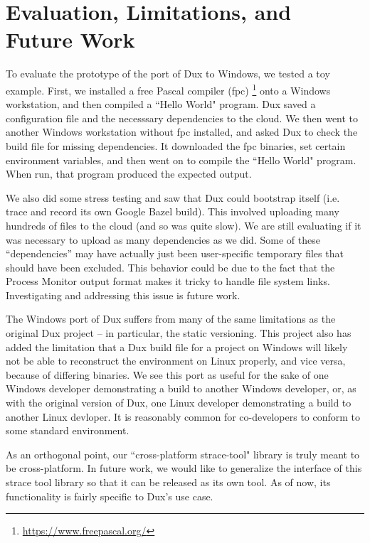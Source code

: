 \documentclass[10pt,conference]{IEEEtran}
\begin{document}
\section{Evaluation, Limitations, and Future Work}

To evaluate the prototype of the port of Dux to Windows, we tested a toy
example. First, we installed a free Pascal compiler (fpc) 
\footnote{\url{https://www.freepascal.org/}} onto a Windows workstation,
and then compiled a ``Hello World" program. Dux saved a configuration 
file and the necesssary dependencies to the cloud. We then went to another Windows
workstation without fpc installed, and asked Dux to check the build file for missing
dependencies. It downloaded the fpc binaries, set certain environment variables,
and then went on to compile the ``Hello World" program. When run, that program
produced the expected output.

We also did some stress testing and saw that Dux could bootstrap itself (i.e. trace
and record its own Google Bazel build). This involved uploading many hundreds
of files to the cloud (and so was quite slow). We are still evaluating if it was
necessary to upload as many dependencies as we did. Some of these 
``dependencies'' may have actually just been user-specific
temporary files that should have been excluded. This behavior could be due
to the fact that the Process Monitor output format makes it tricky to handle file
system links. Investigating and addressing this issue is future work.

The Windows port of Dux suffers from many of the same limitations as the original
Dux project -- in particular, the static versioning. This project also has added
the limitation that a Dux build file for a project on Windows will likely
not be able to reconstruct the environment on Linux properly, and vice versa,
because of differing binaries. We see this port as useful for the sake of one
Windows developer demonstrating a build to another Windows developer, or, as 
with the original  version of Dux, one Linux developer demonstrating a build to 
another Linux devloper. It is reasonably common for co-developers to conform
to some standard environment. 

As an orthogonal point, our ``cross-platform strace-tool" library is truly meant to be
cross-platform. In future work, we would like to generalize the 
interface of this strace tool library so that it can be released as its own tool. 
As of now, its functionality is fairly specific to Dux's use case.
\end{document}
